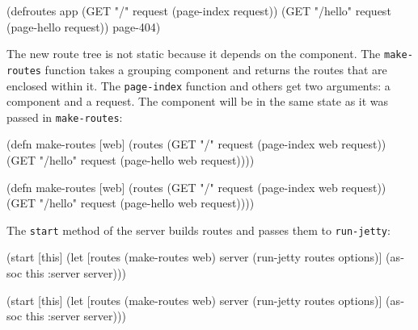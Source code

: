 \else

\begin{english}
  \begin{clojure}
(defroutes app
  (GET "/"      request (page-index request))
  (GET "/hello" request (page-hello request))
  page-404)
  \end{clojure}
\end{english}

\fi

The new route tree is not static because it depends on the component. The \verb|make-routes| function takes a grouping component and returns the routes that are enclosed within it. The \verb|page-index| function and others get two arguments: a component and a request. The component will be in the same state as it was passed in \verb|make-routes|:

\ifnarrow

\begin{english}
  \begin{clojure}
(defn make-routes [web]
  (routes
    (GET "/"
      request (page-index web request))
    (GET "/hello"
      request (page-hello web request))))
  \end{clojure}
\end{english}

\else

\begin{english}
  \begin{clojure}
(defn make-routes [web]
  (routes
   (GET "/"      request (page-index web request))
   (GET "/hello" request (page-hello web request))))
  \end{clojure}
\end{english}

\fi

\noindent
The \verb|start| method of the server builds routes and passes them to \verb|run-jetty|:

\ifnarrow

\begin{english}
  \begin{clojure}
(start [this]
  (let [routes (make-routes web)
        server (run-jetty
                 routes options)]
    (assoc this :server server)))
  \end{clojure}
\end{english}

\else

\begin{english}
  \begin{clojure}
(start [this]
  (let [routes (make-routes web)
        server (run-jetty routes options)]
    (assoc this :server server)))
  \end{clojure}
\end{english}

